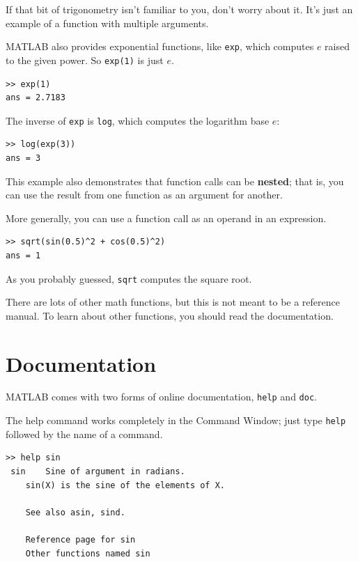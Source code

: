 \documentclass[
]{book}
\begin{document}
If that bit of trigonometry isn't familiar to you, don't worry about
it.  It's just an example of a function with multiple arguments.

MATLAB also provides exponential functions, like {\tt exp}, which
computes $e$ raised to the given power.  So {\tt exp(1)} is just $e$.

\begin{verbatim}
>> exp(1)
ans = 2.7183
\end{verbatim}

The inverse of {\tt exp} is {\tt log}, which computes the logarithm
base $e$:

\begin{verbatim}
>> log(exp(3))
ans = 3
\end{verbatim}

This example also demonstrates that function calls can be {\bf nested};
that is, you can use the result from one function as an argument for
another.

More generally, you can use a function call as an operand in an expression.

\begin{verbatim}
>> sqrt(sin(0.5)^2 + cos(0.5)^2)
ans = 1
\end{verbatim}

As you probably guessed, {\tt sqrt} computes the square root.

There are lots of other math functions, but this is not meant to
be a reference manual.  To learn about other functions, you should
read the documentation.


\section{Documentation}

MATLAB comes with two forms of online documentation, {\tt help}
and {\tt doc}.

The help command works completely in the Command Window; just 
type {\tt help} followed by the name of a command.

\begin{verbatim}
>> help sin
 sin    Sine of argument in radians.
    sin(X) is the sine of the elements of X.

    See also asin, sind.

    Reference page for sin
    Other functions named sin
\end{verbatim}
\end{document}
